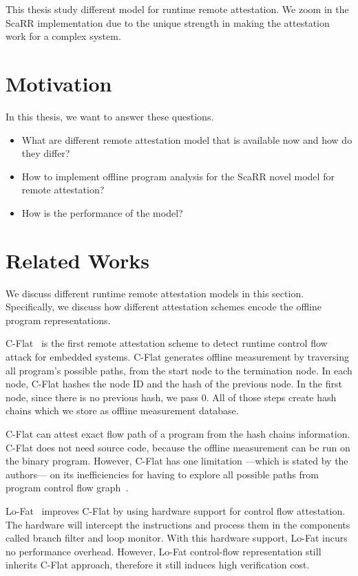 This thesis study different model for runtime remote attestation. We zoom in the
ScaRR implementation due to the unique strength in making the attestation work
for a complex system.

\section{Motivation}

In this thesis, we want to answer these questions.
\begin{itemize}
    \item What are different remote attestation model that is available now and
    how do they differ?
    \item How to implement offline program analysis for the ScaRR novel model
    for remote attestation?
    \item How is the performance of the model?
\end{itemize}

\section{Related Works}

We discuss different runtime remote attestation models in this section.
Specifically, we discuss how different attestation schemes encode the offline
program representations.

C-Flat~\cite{aberaCFLATControlFlowAttestation2016} is the first remote
attestation scheme to detect runtime control flow attack for embedded systems.
C-Flat generates offline measurement by traversing all program's possible paths,
from the start node to the termination node. In each node, C-Flat hashes the
node ID and the hash of the previous node. In the first node, since there is no
previous hash, we pass 0. All of those steps create hash chains which we store
as offline measurement database.

C-Flat can attest exact flow path of a program from the hash chains information.
C-Flat does not need source code, because the offline measurement can be run on
the binary program. However, C-Flat has one limitation ---which is stated by the
authors--- on its inefficiencies for having to explore all possible paths from
program control flow graph~\cite{aberaCFLATControlFlowAttestation2016}.

Lo-Fat~\cite{dessoukyLOFATLowOverheadControl2017} improves C-Flat by using
hardware support for control flow attestation. The hardware will intercept the
instructions and process them in the components called branch filter and loop
monitor. With this hardware support, Lo-Fat incurs no performance overhead.
However, Lo-Fat control-flow representation still inherits C-Flat approach,
therefore it still induces high verification cost.

